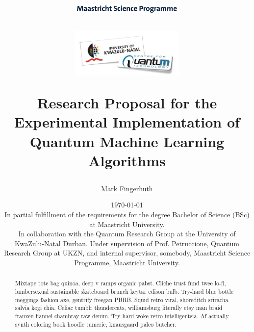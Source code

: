 \documentclass[a4paper]{article}
\newcommand*{\0}{$\ket{0}$}
\newcommand*{\1}{$\ket{1}$}
\begin{document}
\title{
\vspace{1cm}
\begin{figure}[!ht]
\centering
\includegraphics[width=0.5\textwidth]{MSC2.png}
\end{figure}
\vspace{0.3cm}
\begin{figure}[!ht]
\centering
\includegraphics[width=0.5\textwidth]{logo.jpeg}
\end{figure}
\vspace{2cm}
\Huge{\bf{Research Proposal for the} \\ Experimental Implementation of Quantum Machine Learning Algorithms \\}}
\vspace{3cm}
\author{\Large \href{mailto:m.fingerhuth@student.maastrichtuniversity.nl}{Mark Fingerhuth}
}
\date{
\today \\
\vspace{2.0cm}
In partial fulfillment of the requirements for the degree Bachelor of Science (BSc) at Maastricht University. \\
\vspace{1cm}
In collaboration with the Quantum Research Group at the University of KwaZulu-Natal Durban. Under supervision of Prof. Petruccione, Quantum Research Group at UKZN, and internal supervisor, somebody, Maastricht Science Programme, Maastricht University.
}
\maketitle
\setlength{\parindent}{0pt}


\vspace{10.0cm}
\begin{abstract}

Mixtape tote bag quinoa, deep v ramps organic pabst. Cliche trust fund twee lo-fi, lumbersexual sustainable skateboard brunch keytar edison bulb. Try-hard blue bottle meggings fashion axe, gentrify freegan PBRB. Squid retro viral, shoreditch sriracha salvia kogi chia. Celiac tumblr thundercats, williamsburg literally etsy man braid franzen flannel chambray raw denim. Try-hard woke retro intelligentsia. Af actually synth coloring book hoodie tumeric, knausgaard paleo butcher.

\end{abstract}
	\newpage
	\tableofcontents
	\newpage
\end{document}
